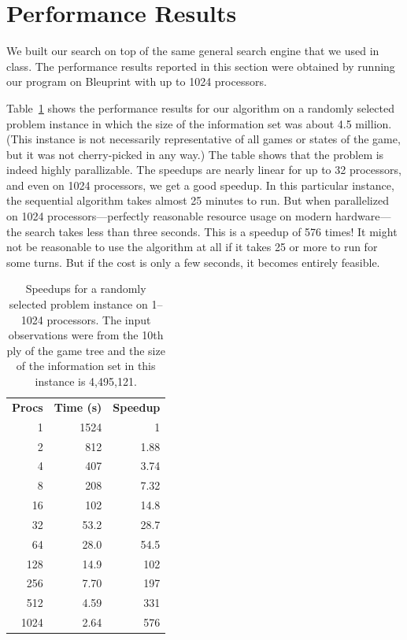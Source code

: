 \documentclass[conference]{IEEEtran}
\begin{document}
\section{Performance Results}
We built our search on top of the same general search engine that we used in class.  The performance results reported in
this section were obtained by running our program on Bleuprint with up to 1024 processors.

Table~\ref{speedups} shows the performance results for our algorithm on a randomly selected problem instance in which
the size of the information set was about 4.5 million.  (This instance is not necessarily representative of all games or
states of the game, but it was not cherry-picked in any way.)  The table shows that the problem is indeed highly
parallizable.  The speedups are nearly linear for up  to 32 processors, and even on 1024 processors, we get a good
speedup.  In this particular instance, the sequential algorithm takes almost 25 minutes to run.  But when parallelized
on 1024 processors---perfectly reasonable resource usage on modern hardware---the search takes less than three seconds.
This is a speedup of 576 times!  It might not be reasonable to use the algorithm at all if it takes 25 or more to run
for some turns.  But if the cost is only a few seconds, it becomes entirely feasible.

\begin{table}
\centering
\begin{tabular}{rrr}
{\bf Procs}	&	{\bf Time (s)} 	&	{\bf Speedup}\\
1	&	1524	&	1\\
2	&	812	&	1.88\\
4	&	407	&	3.74\\
8	&	208	&	7.32\\
16	&	102	&	14.8\\
32	&	53.2	&	28.7\\
64	&	28.0	&	54.5\\
128	&	14.9	&	102\\
256	&	7.70	&	197\\
512	&	4.59	&	331\\
1024	&	2.64	&	576\\
\end{tabular}
\caption{Speedups for a randomly selected problem instance on 1--1024 processors.  The input observations were from the
10th ply of the game tree and the size of the information set in this instance is 4,495,121.}
\label{speedups}
\end{table}
\end{document}
